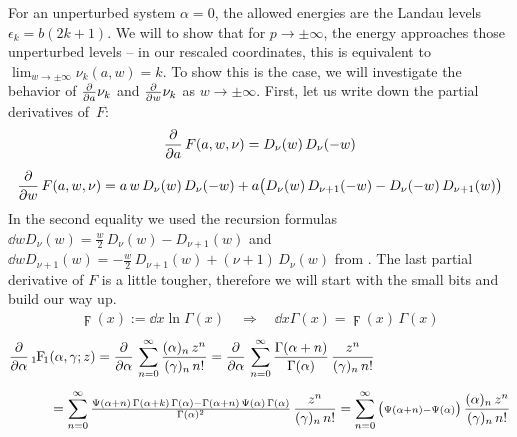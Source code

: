 For an unperturbed system $\alpha=0$, the allowed energies are the Landau levels $\epsilon_k = b(2k+1)$. We will to show that for $p\to\pm\infty$, the energy approaches those unperturbed levels – in our rescaled coordinates, this is equivalent to $\lim_{w\to\pm\infty} \nu_k(a, w) = k$. To show this is the case, we will investigate the behavior of $\frac{\partial }{\partial a} \nu_k$ and $\frac{\partial }{\partial w} \nu_k$ as $w \to \pm\infty$. First, let us write down the partial derivatives of~$F$:
\begin{gather*}
    \frac{\partial }{\partial a} \, F(a,w,\nu) = D_\nu(w) \, D_\nu(-w)
    \\[5pt]
    \frac{\partial }{\partial w} \, F(a,w,\nu)
    = a \, w \, D_\nu(w) \, D_\nu(-w)
    + a \big(
        D_\nu(w) \, D_{\nu + 1}(-w) - D_\nu(-w) \, D_{\nu+1}(w)
    \big)
\end{gather*}
In the second equality we used the recursion formulas $\dd{}{w} D_\nu(w) = \frac{w}{2} \, D_\nu(w) - D_{\nu+1}(w)$ and $\dd{}{w} D_{\nu+1}(w) = -\frac{w}{2} \, D_{\nu+1}(w) + (\nu+1) \, D_\nu(w)$ from \cite{GradshteynRyzhik}. The last partial derivative of $F$ is a little tougher, therefore we will start with the small bits and build our way up.
\begin{align*}
    \digamma(x) := \dd{}{x} \ln \Gamma(x)
    \quad \Longrightarrow \quad
    \dd{}{x} \Gamma(x) = \digamma(x) \, \Gamma(x)
\end{align*}
\begin{align*}
    \pd{}{\alpha} \, \hypF&(\alpha, \gamma; z)
    = \pd{}{\alpha} \, \sum_{n=0}^\infty \frac{(\alpha)_n \, z^n}{(\gamma)_n \, n!}
    = \pd{}{\alpha} \, \sum_{n=0}^\infty \frac{\Gamma(\alpha+n)}{\Gamma(\alpha)} \, \frac{z^n}{(\gamma)_n \, n!}
    \\[5pt]
    &= \sum_{n=0}^\infty \tfrac{\digamma(\alpha+n) \, \Gamma(\alpha+k) \, \Gamma(\alpha) - \Gamma(\alpha+n) \, \digamma(\alpha) \, \Gamma(\alpha)}{\Gamma(\alpha)^2} \, \frac{z^n}{(\gamma)_n \, n!}
    = \sum_{n=0}^\infty \big({ \scriptstyle \digamma(\alpha+n) - \digamma(\alpha) }\big) \, \frac{(\alpha)_n \, z^n}{(\gamma)_n \, n!}
\end{align*}
